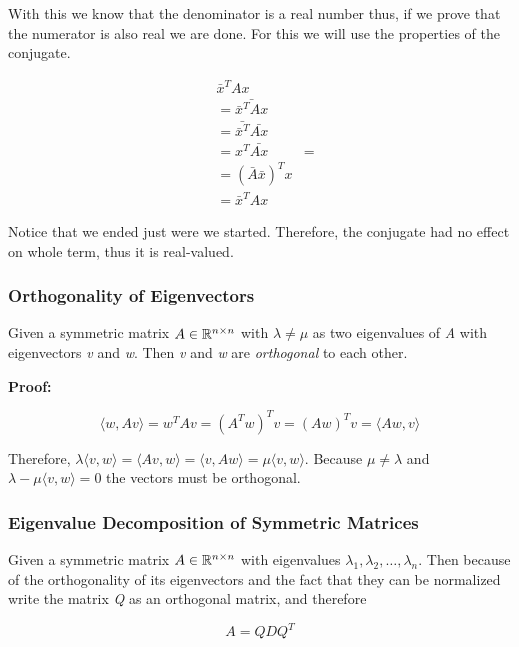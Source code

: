 With this we know that the denominator is a real number thus, if we prove that the numerator is also real 
we are done. For this we will use the properties of the conjugate.

\begin{align*}
    &\bar{x}^T A x\\
    &=\bar{\bar{x}^T A x} \\
    &=\bar{\bar{x}^T} \bar{Ax} \\
    &=x^T \bar{Ax} &= \\
    &=(\bar{A}\bar{x})^T x \\
    &=\bar{x}^T A  x 
\end{align*}

Notice that we ended just were we started. Therefore, the conjugate had no effect on whole term, thus 
it is real-valued.

\QED

\subsubsection{Orthogonality of Eigenvectors}

Given a symmetric matrix \(A \in \mathbb{R}^{n \times n}\) with \(\lambda \ne \mu \) as two eigenvalues of 
\emph{A} with eigenvectors \emph{v} and \emph{w}. Then \emph{v} and \emph{w} are \emph{orthogonal} to each other.
\vspace{\baselineskip}

\textbf{Proof:}

\[
    \langle w, Av \rangle = w^{T} Av = (A^T w)^T v = (Aw)^T v = \langle Aw, v\rangle
\]

Therefore, \(\lambda \langle v, w \rangle = \langle Av, w \rangle = \langle v, Aw\rangle 
= \mu \langle v, w \rangle\). Because \(\mu \ne \lambda\) and \(\lambda - \mu \langle v, w\rangle = 0\)
the vectors must be orthogonal.

\QED

\subsubsection{Eigenvalue Decomposition of Symmetric Matrices}

Given a symmetric matrix \(A \in \mathbb{R}^{n \times n}\) with eigenvalues 
\(\lambda_1, \lambda_2, \dots, \lambda_n\). Then because of the orthogonality of its eigenvectors and 
the fact that they can be normalized write the matrix \emph{Q} as an orthogonal matrix, and therefore

\[
    A = Q D Q^T
\]


